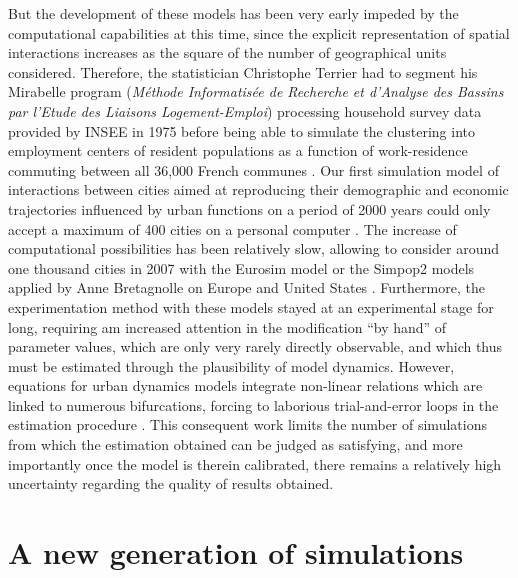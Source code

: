 \documentclass[10pt]{article}
\begin{document}
But the development of these models has been very early impeded by the computational capabilities at this time, since the explicit representation of spatial interactions increases as the square of the number of geographical units considered. Therefore, the statistician Christophe Terrier had to segment his Mirabelle program (\textit{Méthode Informatisée de Recherche et d'Analyse des Bassins par l'Etude des Liaisons Logement-Emploi}) processing household survey data provided by INSEE in 1975 before being able to simulate the clustering into employment centers of resident populations as a function of work-residence commuting between all 36,000 French communes \citep{terrier1980mirabelle}. Our first simulation model of interactions between cities aimed at reproducing their demographic and economic trajectories influenced by urban functions on a period of 2000 years could only accept a maximum of 400 cities on a personal computer \citep{bura1996multiagent,sanders1997simpop}. The increase of computational possibilities has been relatively slow, allowing to consider around one thousand cities in 2007 with the Eurosim model \citep{sanders2007artificial} or the Simpop2 models applied by Anne Bretagnolle on Europe and United States \citep{bretagnolle2010simulating}. Furthermore, the experimentation method with these models stayed at an experimental stage for long, requiring am increased attention in the modification ``by hand'' of parameter values, which are only very rarely directly observable, and which thus must be estimated through the plausibility of model dynamics. However, equations for urban dynamics models integrate non-linear relations which are linked to numerous bifurcations, forcing to laborious trial-and-error loops in the estimation procedure \citep{sanders2007artificial}. This consequent work limits the number of simulations from which the estimation obtained can be judged as satisfying, and more importantly once the model is therein calibrated, there remains a relatively high uncertainty regarding the quality of results obtained.


\section{A new generation of simulations}
\end{document}
